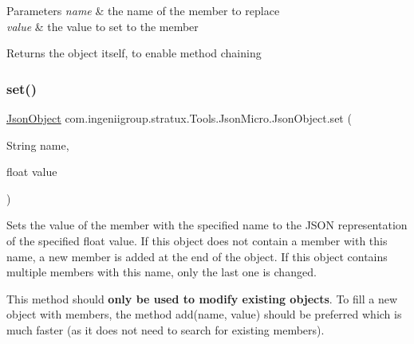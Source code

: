 \begin{DoxyParams}{Parameters}
{\em name} & the name of the member to replace \\
\hline
{\em value} & the value to set to the member \\
\hline
\end{DoxyParams}
\begin{DoxyReturn}{Returns}
the object itself, to enable method chaining 
\end{DoxyReturn}
\mbox{\label{classcom_1_1ingeniigroup_1_1stratux_1_1_tools_1_1_json_micro_1_1_json_object_ab89b52682e07bb639cecc8b6e7d1b464}} 
\subsubsection{\texorpdfstring{set()}{set()}\hspace{0.1cm}{\footnotesize\ttfamily [3/7]}}
{\footnotesize\ttfamily \hyperlink{classcom_1_1ingeniigroup_1_1stratux_1_1_tools_1_1_json_micro_1_1_json_object}{Json\+Object} com.\+ingeniigroup.\+stratux.\+Tools.\+Json\+Micro.\+Json\+Object.\+set (\begin{DoxyParamCaption}\item[{String}]{name,  }\item[{float}]{value }\end{DoxyParamCaption})}

Sets the value of the member with the specified name to the J\+S\+ON representation of the specified {\ttfamily float} value. If this object does not contain a member with this name, a new member is added at the end of the object. If this object contains multiple members with this name, only the last one is changed. 

This method should {\bfseries only be used to modify existing objects}. To fill a new object with members, the method {\ttfamily add(name, value)} should be preferred which is much faster (as it does not need to search for existing members). 


